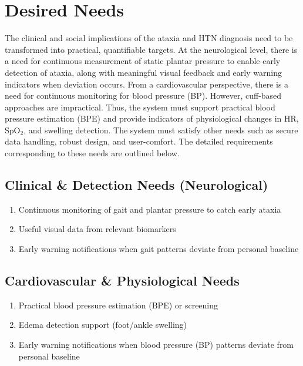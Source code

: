 \section{Desired Needs}
The clinical and social implications of the ataxia and HTN diagnosis need to be transformed into practical, quantifiable targets. At the neurological level, there is a need for continuous measurement of static plantar pressure to enable early detection of ataxia, along with meaningful visual feedback and early warning indicators when deviation occurs. From a cardiovascular perspective, there is a need for continuous monitoring for blood pressure (BP). However, cuff-based approaches are impractical. Thus, the system must support practical blood pressure estimation (BPE) and provide indicators of physiological changes in HR, SpO$_2$, and swelling detection. The system must satisfy other needs such as secure data handling, robust design, and user-comfort. The detailed requirements corresponding to these needs are outlined below.\\

    \subsection{Clinical \& Detection Needs (Neurological)}
    \begin{enumerate}
        \item Continuous monitoring of gait and plantar pressure to catch early ataxia
        \item Useful visual data from relevant biomarkers
        \item Early warning notifications when gait patterns deviate from personal baseline
    \end{enumerate}

    \subsection{Cardiovascular \& Physiological Needs}
    \begin{enumerate}
        \item Practical blood pressure estimation (BPE) or screening
        \item Edema detection support (foot/ankle swelling)
        \item Early warning notifications when blood pressure (BP) patterns deviate from personal baseline
    \end{enumerate}

